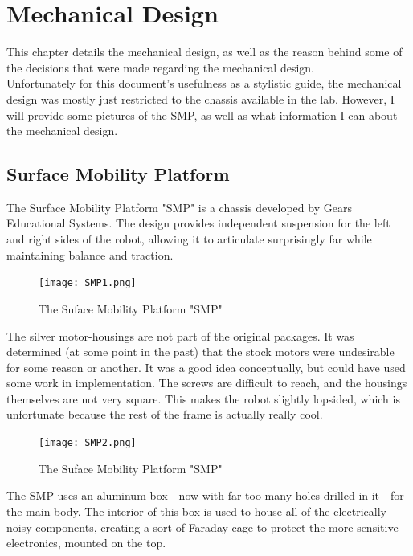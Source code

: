 
\chapter{Mechanical Design}
\label{chap:mechdesign}

This chapter details the mechanical design, as well as the reason behind some of the decisions that were made regarding the mechanical design.\\

Unfortunately for this document's usefulness as a stylistic guide, the mechanical design was mostly just restricted to the chassis available in the lab. However, I will provide some pictures of the SMP, as well as what information I can about the mechanical design.

\section{Surface Mobility Platform}

The Surface Mobility Platform "SMP" is a chassis developed by Gears Educational Systems. The design provides independent suspension for the left and right sides of the robot, allowing it to articulate surprisingly far while maintaining balance and traction.

\begin{figure}[h]
\centering
\texttt{[image: SMP1.png]}
\label{fig:smp1}
\caption{The Suface Mobility Platform "SMP"}
\end{figure}

The silver motor-housings are not part of the original packages. It was determined (at some point in the past) that the stock motors were undesirable for some reason or another. It was a good idea conceptually, but could have used some work in implementation. The screws are difficult to reach, and the housings themselves are not very square. This makes the robot slightly lopsided, which is unfortunate because the rest of the frame is actually really cool.

\begin{figure}[h]
\centering
\texttt{[image: SMP2.png]}
\label{fig:smp2}
\caption{The Suface Mobility Platform "SMP"}
\end{figure}

The SMP uses an aluminum box - now with far too many holes drilled in it - for the main body. The interior of this box is used to house all of the electrically noisy components, creating a sort of Faraday cage to protect the more sensitive electronics, mounted on the top.

